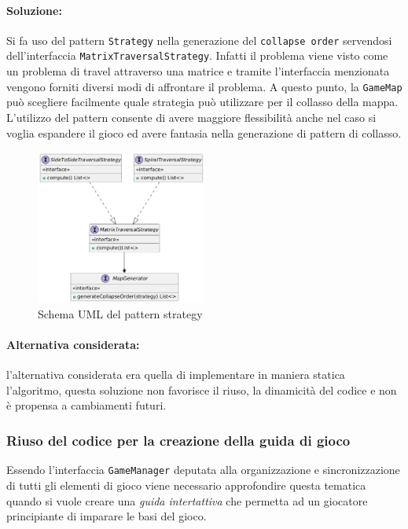 \documentclass[a4paper,12pt]{report}
\begin{document}
\paragraph{Soluzione:} Si fa uso del pattern \texttt{Strategy} nella generazione del \texttt{collapse order} servendosi dell'interfaccia \texttt{MatrixTraversalStrategy}. Infatti il problema viene visto come un problema di travel attraverso una matrice e tramite l'interfaccia menzionata vengono forniti diversi modi di affrontare il problema.
\newline
A questo punto, la \texttt{GameMap} può scegliere facilmente quale strategia può utilizzare per il collasso della mappa. L'utilizzo del pattern consente di avere maggiore flessibilità anche nel caso si voglia espandere il gioco ed avere fantasia nella generazione di pattern di collasso.
%
\begin{figure}[H]
    \centering{}
    \includegraphics[width=0.5\textwidth]{img/matrix-trav-strat.png}
    \caption{Schema UML del pattern strategy}
    \label{img:mapgenerator-gamemap}
\end{figure}
\paragraph{Alternativa considerata:} l'alternativa considerata era quella di implementare in maniera statica l'algoritmo, questa soluzione non favorisce il riuso, la dinamicità del codice e non è propensa a cambiamenti futuri.
\subsubsection{Riuso del codice per la creazione della guida di gioco}
Essendo l'interfaccia \texttt{GameManager} deputata alla organizzazione e sincronizzazione di tutti gli elementi di gioco viene necessario approfondire questa tematica quando si vuole creare una \textit{guida intertattiva} che permetta ad un giocatore principiante di imparare le basi del gioco.
\end{document}
